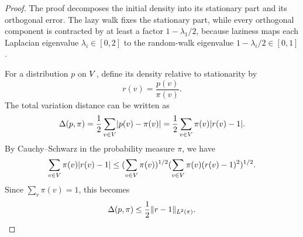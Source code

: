 \begin{proof}
	The proof decomposes the initial density into its stationary part and its orthogonal error. The lazy walk fixes the stationary part, while every orthogonal component is contracted by at least a factor \(1-\lambda_1/2\), because laziness maps each Laplacian eigenvalue \(\lambda_i\in[0,2]\) to the random-walk eigenvalue \(1-\lambda_i/2\in[0,1]\).

	For a distribution \(p\) on \(V\), define its density relative to stationarity by
	\begin{equation}
		r(v)=\frac{p(v)}{\pi(v)}.
	\end{equation}
	The total variation distance can be written as
	\begin{equation}
		\Delta(p,\pi)=\frac{1}{2}\sum_{v\in V}\lvert p(v)-\pi(v)\rvert
		=
		\frac{1}{2}\sum_{v\in V}\pi(v)\lvert r(v)-1\rvert.
	\end{equation}
	By Cauchy--Schwarz in the probability measure \(\pi\), we have
	\begin{equation}
		\sum_{v\in V}\pi(v)\lvert r(v)-1\rvert
		\leq
		(\sum_{v\in V}\pi(v))^{1/2}
		(\sum_{v\in V}\pi(v)(r(v)-1)^2)^{1/2}.
	\end{equation}
	Since \(\sum_v\pi(v)=1\), this becomes
	\begin{equation}
		\Delta(p,\pi)\leq \frac{1}{2}\lVert r-1\rVert_{L^2(\pi)}.
	\end{equation}


\end{proof}
